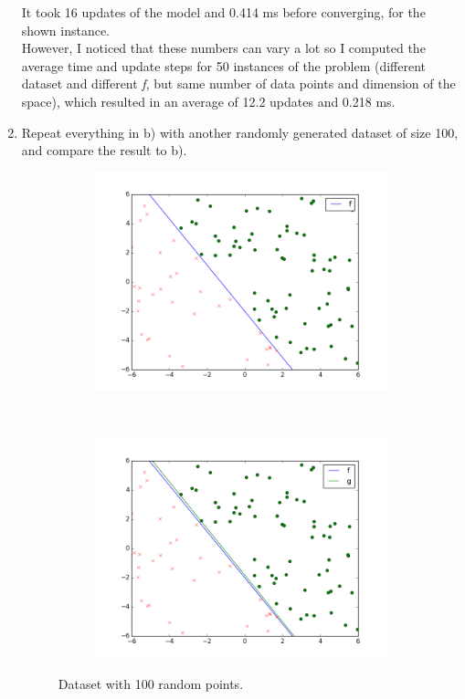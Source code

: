 \documentclass{article}
\begin{document}
\begin{enumerate}[label=(\alph*)]
It took 16 updates of the model and 0.414 ms before converging, for the shown instance. \\
However, I noticed that these numbers can vary a lot so I computed the average time and update steps for 50 instances of the problem (different dataset and different \textit{f}, but same number of data points and dimension of the space), which resulted in an average of 12.2 updates and 0.218 ms.

\item Repeat everything in b) with another randomly generated dataset of size 100, and compare the result to b).

\begin{figure}[H]
    \centering
    \begin{subfigure}[t]{0.5\textwidth}
        \centering
		\includegraphics[scale=0.35]{images/4_a.png} 
    \end{subfigure}%
    ~ 
    \begin{subfigure}[t]{0.5\textwidth}
        \centering
		\includegraphics[scale=0.35]{images/4_b.png} 
    \end{subfigure}
    \caption{Dataset with 100 random points.}
\end{figure}


\end{enumerate}
\end{document}

